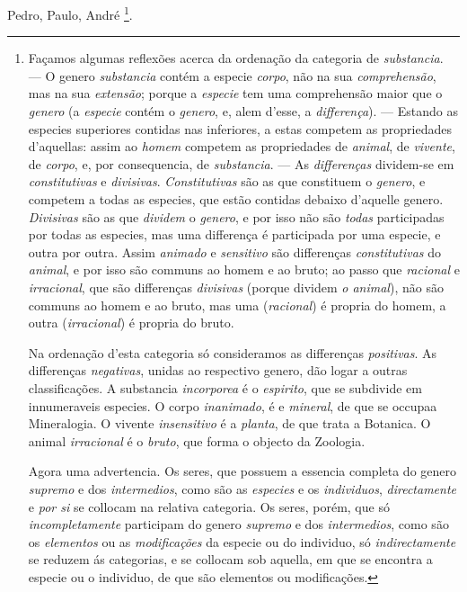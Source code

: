 Pedro, Paulo, André \footnote{Façamos algumas reflexões acerca da ordenação da categoria de \emph{substancia}. --- O genero \emph{substancia} contém a especie \emph{corpo}, não na sua \emph{comprehensão}, mas na sua \emph{extensão}; porque a \emph{especie} tem uma comprehensão maior que o \emph{genero} (a \emph{especie} contém o \emph{genero}, e, alem d'esse, a \emph{differença}). --- Estando as especies superiores contidas nas inferiores, a estas competem as propriedades d'aquellas: assim ao \emph{homem} competem as propriedades de \emph{animal}, de \emph{vivente}, de \emph{corpo}, e, por consequencia, de \emph{substancia}. --- As \emph{differenças} dividem-se em \emph{constitutivas} e \emph{divisivas}. \emph{Constitutivas} são as que constituem o \emph{genero}, e competem a todas as especies, que estão contidas debaixo d'aquelle genero. \emph{Divisivas} são as que \emph{dividem} o \emph{genero}, e por isso não são \emph{todas} participadas por todas as especies, mas uma differença é participada por uma especie, e outra por outra. Assim \emph{animado} e \emph{sensitivo} são differenças \emph{constitutivas} do \emph{animal}, e por isso são communs ao homem e ao bruto; ao passo que \emph{racional} e \emph{irracional}, que são differenças \emph{divisivas} (porque dividem \emph{o animal}), não são communs ao homem e ao bruto, mas uma (\emph{racional}) é propria do homem, a outra (\emph{irracional}) é propria do bruto.\par Na ordenação d'esta categoria só consideramos as differenças \emph{positivas}. As differenças \emph{negativas}, unidas ao respectivo genero, dão logar a outras classificações. A substancia \emph{incorporea} é o \emph{espirito}, que se subdivide em innumeraveis especies. O corpo \emph{inanimado}, é e \emph{mineral}, de que se occupaa Mineralogia. O vivente \emph{insensitivo} é a \emph{planta}, de que trata a Botanica. O animal \emph{irracional} é o \emph{bruto}, que forma o objecto da Zoologia.\par Agora uma advertencia. Os seres, que possuem a essencia completa do genero \emph{supremo} e dos \emph{intermedios}, como são as \emph{especies} e os \emph{individuos}, \emph{directamente} e \emph{por si} se collocam na relativa categoria. Os seres, porém, que só \emph{incompletamente} participam do genero \emph{supremo} e dos \emph{intermedios}, como são os \emph{elementos} ou as \emph{modificações} da especie ou do individuo, só \emph{indirectamente} se reduzem ás categorias, e se collocam sob aquella, em que se encontra a especie ou o individuo, de que são elementos ou modificações.}.

